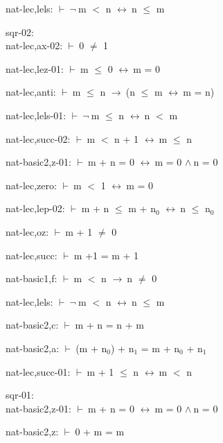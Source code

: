 \documentclass[a4paper]{article}
\newcommand{\Fol}{\mbox{$\vdash\ $}}
\newcommand{\Not}{\mbox{$\neg\ $}}
\newcommand{\And}{\mbox{$\wedge\ $}}
\newcommand{\Imp}{\mbox{$\rightarrow\ $}}
\newcommand{\Equiv}{\mbox{$\leftrightarrow\ $}}
\begin{document}
nat-lec,lels: 
 \Fol \Not m $<$ n \Equiv n $\le$ m



\bigskip

sqr-02:\\ nat-lec,ax-02: 
 \Fol 0 $\neq$ 1



nat-lec,lez-01: 
 \Fol m $\le$ 0 \Equiv m = 0



nat-lec,anti: 
 \Fol m $\le$ n \Imp (n $\le$ m \Equiv m = n)



nat-lec,lels-01: 
 \Fol \Not m $\le$ n \Equiv n $<$ m



nat-lec,succ-02: 
 \Fol m $<$ n + 1 \Equiv m $\le$ n



nat-basic2,z-01: 
 \Fol m + n = 0 \Equiv m = 0 \And n = 0



nat-lec,zero: 
 \Fol m $<$ 1 \Equiv m = 0



nat-lec,lep-02: 
 \Fol m + n $\le$ m + $\mbox{n}_{0}$ \Equiv n $\le$ $\mbox{n}_{0}$



nat-lec,oz: 
 \Fol m + 1 $\neq$ 0



nat-lec,succ: 
 \Fol m +1 = m + 1



nat-basic1,f: 
 \Fol m $<$ n \Imp n $\neq$ 0



nat-lec,lels: 
 \Fol \Not m $<$ n \Equiv n $\le$ m



nat-basic2,c: 
 \Fol m + n = n + m



nat-basic2,a: 
 \Fol (m + $\mbox{n}_{0}$) + $\mbox{n}_{1}$ = m + $\mbox{n}_{0}$ + $\mbox{n}_{1}$



nat-lec,succ-01: 
 \Fol m + 1 $\le$ n \Equiv m $<$ n



\bigskip

sqr-01:\\ nat-basic2,z-01: 
 \Fol m + n = 0 \Equiv m = 0 \And n = 0



nat-basic2,z: 
 \Fol 0 + m = m
\end{document}
